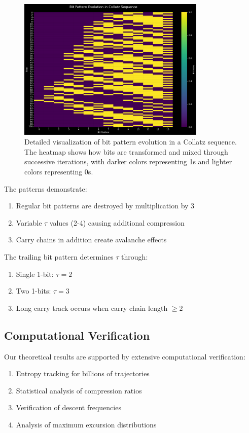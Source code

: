 \begin{figure}[h]
\centering
\includegraphics[width=0.8\textwidth]{figures/bit_evolution.svg}
\caption{Detailed visualization of bit pattern evolution in a Collatz sequence. The heatmap shows how bits are transformed and mixed through successive iterations, with darker colors representing 1s and lighter colors representing 0s.}
\label{fig:bit_evolution}
\end{figure}

The patterns demonstrate:
\begin{enumerate}
\item Regular bit patterns are destroyed by multiplication by 3
\item Variable $\tau$ values (2-4) causing additional compression
\item Carry chains in addition create avalanche effects
\end{enumerate}

The trailing bit pattern determines $\tau$ through:
\begin{enumerate}
\item Single 1-bit: $\tau = 2$
\item Two 1-bits: $\tau = 3$
\item Long carry track occurs when carry chain length $\geq 2$
\end{enumerate}

\subsection{Computational Verification}

Our theoretical results are supported by extensive computational verification:
\begin{enumerate}
\item Entropy tracking for billions of trajectories
\item Statistical analysis of compression ratios
\item Verification of descent frequencies
\item Analysis of maximum excursion distributions
\end{enumerate}

